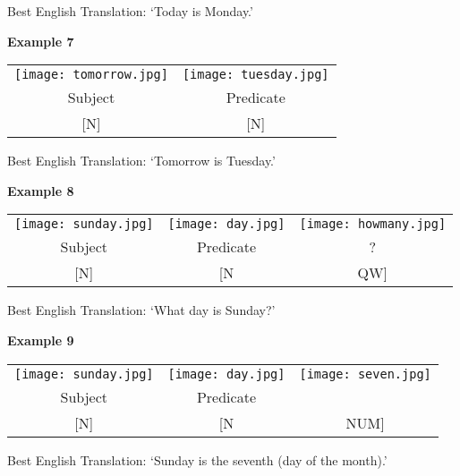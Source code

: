 \documentclass{tufte-book}
\begin{document}
Best English Translation: `Today is Monday.'

\vspace{0.25cm}\noindent \textbf{Example 7}
\begin{table*}[h!]
\begin{tabular}{c | c}
\texttt{[image: tomorrow.jpg]}&\texttt{[image: tuesday.jpg]}  \\
\footnotesize Subject &  \footnotesize Predicate  \\
\footnotesize [N] & \footnotesize [N] \\
\end{tabular}
\end{table*}

Best English Translation: `Tomorrow is Tuesday.'
\newpage

\vspace{0.25cm}\noindent \textbf{Example 8}
\begin{table*}[h!]
\begin{tabular}{c | c c}
\texttt{[image: sunday.jpg]}&\texttt{[image: day.jpg]} &\texttt{[image: howmany.jpg]}  \\
\footnotesize Subject &  \footnotesize Predicate  & \footnotesize ?\\
\footnotesize [N] & \footnotesize [N & \footnotesize QW] \\
\end{tabular}
\end{table*}

Best English Translation: `What day is Sunday?'

\vspace{0.25cm}\noindent \textbf{Example 9}
\begin{table*}[h!]
\begin{tabular}{c | c c}
\texttt{[image: sunday.jpg]}&\texttt{[image: day.jpg]} &\texttt{[image: seven.jpg]}  \\
\footnotesize Subject &  \footnotesize Predicate  & \\
\footnotesize [N] & \footnotesize [N & \footnotesize NUM] \\
\end{tabular}
\end{table*}
\begin{fullwidth}
Best English Translation: `Sunday is the seventh (day of the month).'
\end{fullwidth}

\newpage
\end{document}
